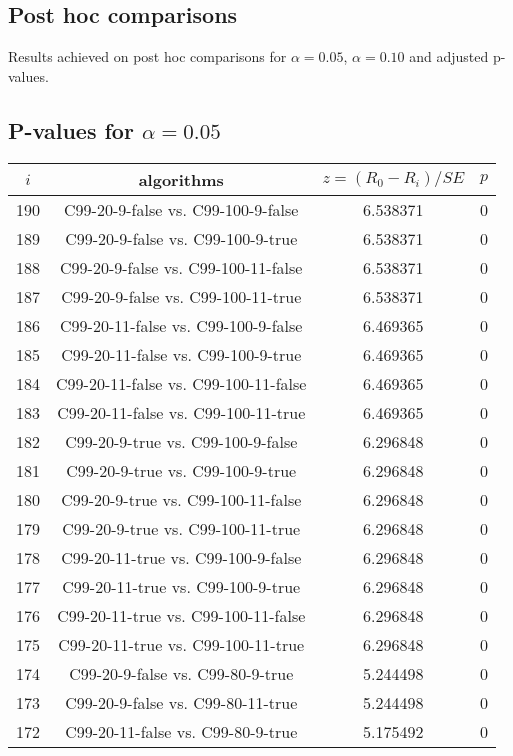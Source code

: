 \documentclass[a4paper,10pt]{article}
\begin{document}
\begin{landscape}
\pagebreak

\section{Post hoc comparisons}

Results achieved on post hoc comparisons for $\alpha = 0.05$, $\alpha = 0.10$ and adjusted p-values.

\subsection{P-values for $\alpha=0.05$}

\begin{table}[!htp]
\centering\scriptsize
\begin{tabular}{cccc}
$i$&algorithms&$z=(R_0 - R_i)/SE$&$p$\\
\hline190&C99-20-9-false vs. C99-100-9-false&6.538371&0\\
189&C99-20-9-false vs. C99-100-9-true&6.538371&0\\
188&C99-20-9-false vs. C99-100-11-false&6.538371&0\\
187&C99-20-9-false vs. C99-100-11-true&6.538371&0\\
186&C99-20-11-false vs. C99-100-9-false&6.469365&0\\
185&C99-20-11-false vs. C99-100-9-true&6.469365&0\\
184&C99-20-11-false vs. C99-100-11-false&6.469365&0\\
183&C99-20-11-false vs. C99-100-11-true&6.469365&0\\
182&C99-20-9-true vs. C99-100-9-false&6.296848&0\\
181&C99-20-9-true vs. C99-100-9-true&6.296848&0\\
180&C99-20-9-true vs. C99-100-11-false&6.296848&0\\
179&C99-20-9-true vs. C99-100-11-true&6.296848&0\\
178&C99-20-11-true vs. C99-100-9-false&6.296848&0\\
177&C99-20-11-true vs. C99-100-9-true&6.296848&0\\
176&C99-20-11-true vs. C99-100-11-false&6.296848&0\\
175&C99-20-11-true vs. C99-100-11-true&6.296848&0\\
174&C99-20-9-false vs. C99-80-9-true&5.244498&0\\
173&C99-20-9-false vs. C99-80-11-true&5.244498&0\\
172&C99-20-11-false vs. C99-80-9-true&5.175492&0\\

\end{tabular}
\end{table}
\end{landscape}
\end{document}

